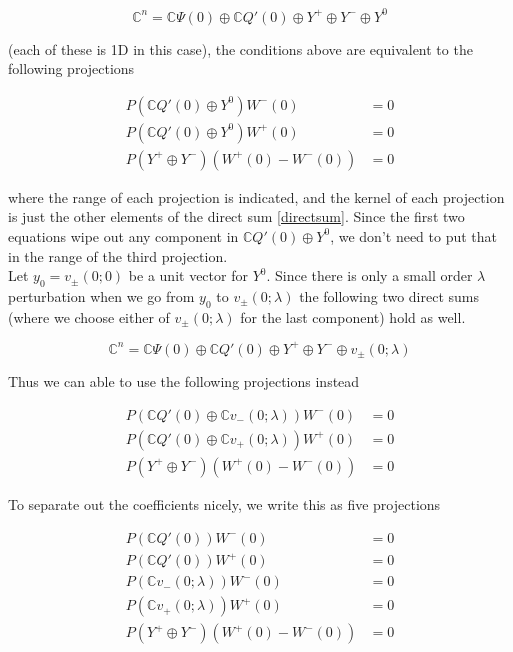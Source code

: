 \documentclass[12pt]{article}
\def\C{{\mathbb C}}
\begin{document}
\begin{equation}\label{directsum}
\C^n = \C\Psi(0) \oplus \C Q'(0) \oplus Y^+ \oplus Y^- \oplus Y^0
\end{equation}

(each of these is 1D in this case), the conditions above are equivalent to the following projections

\begin{align*}
P(\C Q'(0) \oplus Y^0 )W^-(0) &= 0 \\
P(\C Q'(0) \oplus Y^0 )W^+(0) &= 0 \\
P(Y^+ \oplus Y^-) (W^+(0) - W^-(0) ) &= 0
\end{align*}

where the range of each projection is indicated, and the kernel of each projection is just the other elements of the direct sum \eqref{directsum}. Since the first two equations wipe out any component in $\C Q'(0) \oplus Y^0$, we don't need to put that in the range of the third projection. \\

Let $y_0 = v_\pm(0; 0)$ be a unit vector for $Y^0$. Since there is only a small order $\lambda$ perturbation when we go from $y_0$ to $v_\pm(0; \lambda)$ the following two direct sums (where we choose either of $v_\pm(0; \lambda)$ for the last component) hold as well.

\begin{equation}\label{directsum2}
\C^n = \C\Psi(0) \oplus \C Q'(0) \oplus Y^+ \oplus Y^- \oplus v_\pm(0; \lambda)
\end{equation}

Thus we can able to use the following projections instead

\begin{align*}
P(\C Q'(0) \oplus \C v_-(0; \lambda) )W^-(0) &= 0 \\
P(\C Q'(0) \oplus \C v_+(0; \lambda) )W^+(0) &= 0 \\
P(Y^+ \oplus Y^-) (W^+(0) - W^-(0) ) &= 0
\end{align*}

To separate out the coefficients nicely, we write this as five projections

\begin{align*}
P(\C Q'(0) )W^-(0) &= 0 \\
P(\C Q'(0) )W^+(0) &= 0 \\
P(\C v_-(0; \lambda))W^-(0) &= 0 \\
P(\C v_+(0; \lambda))W^+(0) &= 0 \\
P(Y^+ \oplus Y^-) (W^+(0) - W^-(0) ) &= 0
\end{align*}
\end{document}
